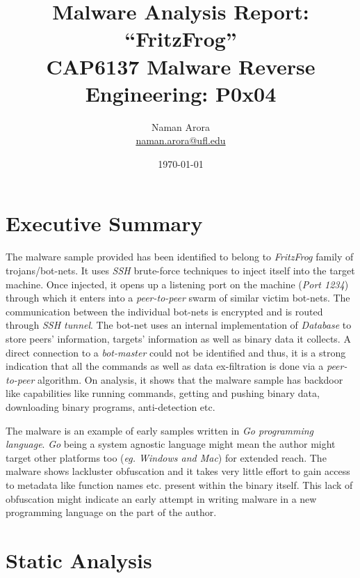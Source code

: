 \documentclass[10pt,a4paper]{article}
\begin{document}

\title{Malware Analysis Report: ``FritzFrog''\\ \vspace{-8pt} {\large CAP6137 Malware Reverse Engineering: P0x04}}
\author{{Naman Arora \\ \vspace{-10pt}\small \href{mailto:naman.arora@ufl.edu}{naman.arora@ufl.edu}}}
\date{\today}

\maketitle
\newpage
\tableofcontents
\newpage
\section{Executive Summary}
The malware sample provided has been identified to belong to \textit{FritzFrog} family of trojans/bot-nets.
It uses \textit{SSH} brute-force techniques to inject itself into the target machine.
Once injected, it opens up a listening port on the machine (\textit{Port 1234}) through which it enters into a \textit{peer-to-peer} swarm of similar victim bot-nets.
The communication between the individual bot-nets is encrypted and is routed through \textit{SSH tunnel}.
The bot-net uses an internal implementation of \textit{Database} to store peers' information, targets' information as well as binary data it collects.
A direct connection to a \textit{bot-master} could not be identified and thus, it is a strong indication that all the commands as well as data ex-filtration is done via a \textit{peer-to-peer} algorithm.
On analysis, it shows that the malware sample has backdoor like capabilities like running commands, getting and pushing binary data, downloading binary programs, anti-detection etc.

The malware is an example of early samples written in \textit{Go programming language}.
\textit{Go} being a system agnostic language might mean the author might target other platforms too (\textit{eg. Windows and Mac}) for extended reach.
The malware shows lackluster obfuscation and it takes very little effort to gain access to metadata like function names etc. present within the binary itself.
This lack of obfuscation might indicate an early attempt in writing malware in a new programming language on the part of the author.

\newpage
\section{Static Analysis}
\end{document}
